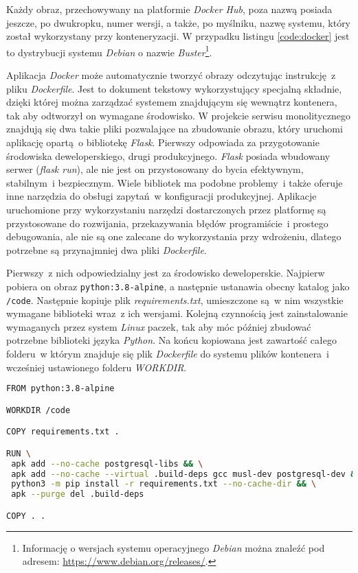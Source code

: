 Każdy obraz, przechowywany na platformie \textit{Docker Hub}, poza nazwą posiada jeszcze, po dwukropku, numer wersji, a także, po myślniku, nazwę systemu, który został wykorzystany przy konteneryzacji. W przypadku listingu \ref{code:docker} jest to dystrybucji systemu \textit{Debian} o nazwie \textit{Buster}\footnote{Informację o wersjach systemu operacyjnego \textit{Debian} można znaleźć pod adresem: \url{https://www.debian.org/releases/}.}.

Aplikacja \textit{Docker} może automatycznie tworzyć obrazy odczytując instrukcję~z pliku \textit{Dockerfile}. Jest to dokument tekstowy wykorzystujący specjalną składnie, dzięki której można zarządzać systemem znajdującym się wewnątrz kontenera, tak aby odtworzył on wymagane środowisko. W projekcie serwisu monolitycznego znajdują się dwa takie pliki pozwalające na zbudowanie obrazu, który uruchomi aplikację opartą~o bibliotekę \textit{Flask}. Pierwszy odpowiada za przygotowanie środowiska deweloperskiego, drugi produkcyjnego. \textit{Flask} posiada wbudowany serwer (\textit{flask run}), ale nie jest on przystosowany do bycia efektywnym, stabilnym~i bezpiecznym\cite{flask}. Wiele bibliotek ma podobne problemy~i także oferuje inne narzędzia do obsługi zapytań~w konfiguracji produkcyjnej\cite{django}. Aplikacje uruchomione przy wykorzystaniu narzędzi dostarczonych przez platformę są przystosowane do rozwijania, przekazywania błędów programiście~i prostego debugowania, ale nie są one zalecane do wykorzystania przy wdrożeniu, dlatego potrzebne są przynajmniej dwa pliki \textit{Dockerfile}.

Pierwszy~z nich odpowiedzialny jest za środowisko deweloperskie. Najpierw pobiera on obraz \verb|python:3.8-alpine|, a następnie ustanawia obecny katalog jako \verb|/code|. Następnie kopiuje plik \textit{requirements.txt}, umieszczone są~w nim wszystkie wymagane biblioteki wraz~z ich wersjami. Kolejną czynnością jest zainstalowanie wymaganych przez system \textit{Linux} paczek, tak aby móc później zbudować potrzebne biblioteki języka \textit{Python}. Na końcu kopiowana jest zawartość całego folderu~w którym znajduje się plik \textit{Dockerfile} do systemu plików kontenera~i wcześniej ustawionego folderu \textit{WORKDIR}.

\begin{lstlisting}[language=Bash, caption={Plik \textit{Dockerfile} wykorzystany do zbudowania obrazu aplikacji monolitycznej.}, label={code:dockerfile}]
FROM python:3.8-alpine

WORKDIR /code

COPY requirements.txt .

RUN \
 apk add --no-cache postgresql-libs && \
 apk add --no-cache --virtual .build-deps gcc musl-dev postgresql-dev && \
 python3 -m pip install -r requirements.txt --no-cache-dir && \
 apk --purge del .build-deps

COPY . .
\end{lstlisting}

